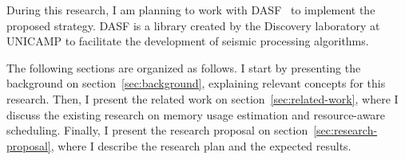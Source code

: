 During this research, I am planning to work with DASF~\cite{dasf} to implement the proposed strategy.
DASF is a library created by the Discovery laboratory at UNICAMP to facilitate the development of seismic processing algorithms.

The following sections are organized as follows.
I start by presenting the background on section~\ref{sec:background}, explaining relevant concepts for this research.
Then, I present the related work on section~\ref{sec:related-work}, where I discuss the existing research on memory usage estimation and resource-aware scheduling.
Finally, I present the research proposal on section~\ref{sec:research-proposal}, where I describe the research plan and the expected results.
